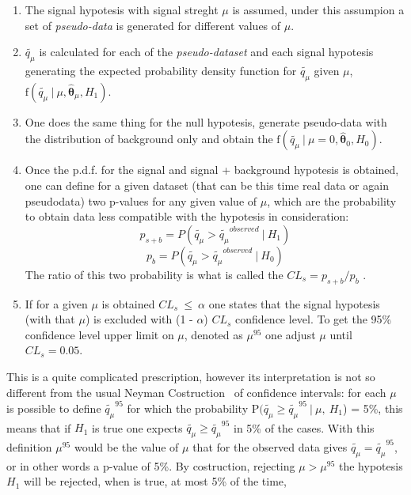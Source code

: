\begin{enumerate}
	\item The signal hypotesis with signal streght $\mu$ is assumed, under this assumpion a set of 
	\textit{pseudo-data} is generated for different values of $\mu$.

	\item  $\tilde{q_{\mu}}$ is calculated for each of the \textit{pseudo-dataset} and each signal hypotesis generating
	the expected probability density function for $\tilde{q_{\mu}}$ given $\mu$, 
	$\text{f}(\tilde{q_{\mu}} ~| ~ \mu, \hat{\boldsymbol{\theta}}_{\mu},H_1)$.

	\item One does the same thing for the null hypotesis, generate pseudo-data with the distribution of background only and 
	obtain  the $\text{f}(\tilde{q_{\mu}} ~ | ~ \mu = 0, \hat{\boldsymbol{\theta}}_{0}, H_0)$.

	\item Once the p.d.f. for the signal and signal + background hypotesis is obtained, one can define for a given dataset (that can be this time
	real data or again pseudodata)  two p-values for any given value of $\mu$, which are the probability to obtain data less compatible with the hypotesis in consideration:
	$$
	p_{s+b} = P(\tilde{q_{\mu}} > \tilde{q_{\mu}}^{observed} ~ | ~ H_1)  
	$$
	$$ 
	p_{b} = P(\tilde{q_{\mu}} > \tilde{q_{\mu}}^{observed} ~ | ~ H_0)
	$$
	The ratio of this two probability is what is called the $CL_{s} = p_{s+b} / p_{b}$ \cite{}.

	\item If for a given $\mu$ is obtained $CL_{s} ~ \leq ~ \alpha $ one states that the signal hypotesis (with that $\mu$) 
	is excluded with (1 - $\alpha$) $CL_{s}$ confidence level. To get the 95\% confidence level upper limit on $\mu$,
	denoted as $\mu^{95}$ one adjust $\mu$ until $CL_{s} = 0.05$. 
\end{enumerate}
This is a quite complicated prescription, however 
its interpretation is not so different from the usual Neyman Costruction~\cite{} of confidence intervals:
for each $\mu$ is possible to define $\tilde{q_{\mu}}^{95}$ for which the probability 
P$(\tilde{q_{\mu}} \geq \tilde{q_{\mu}}^{95} ~ |~ \mu, ~ H_1$) = 5\%, this means that if $H_1$ is true one expects 
$\tilde{q_{\mu}} \geq \tilde{q_{\mu}}^{95}$ in 5\% of the cases. With this definition $\mu^{95}$ would be the value of $\mu$
that for the observed data gives $\tilde{q_{\mu}} = \tilde{q_{\mu}}^{95}$, or in other words a p-value of 5\%.
By costruction, rejecting $\mu > \mu^{95}$ the hypotesis $H_1$ will be rejected, when is true, at most 5\% of the time,
